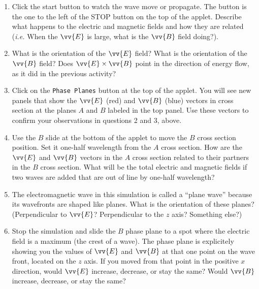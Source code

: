 \begin{enumerate}
\item Click the start button to watch the wave move or propagate. The button is the one to the left of the STOP button on the top of the applet.
Describe what happens to the electric and magnetic fields and how they are related
({\it i.e.} When the $\vv {E}$ is large, what is the $\vv {B}$ field doing?).
\vspace{3.0cm}

\item What is the orientation of the $\vv {E}$ field?
What is the orientation of the $\vv {B}$ field?
Does $\vv {E} \times \vv {B}$ point in the direction of energy flow, as it did in the previous activity?
\vspace{2.0cm}


\item Click on the {\tt Phase Planes} button at the top of the applet.
You will see new panels that show the $\vv {E}$ (red) and $\vv {B}$ (blue) vectors in cross section at the
planes $A$ and $B$ labeled in the top panel.
Use these vectors to confirm your observations in questions 2 and 3, above.
\vspace{3.0cm}

\item Use the $B$ slide at the bottom of the applet to move the $B$ cross 
section position.
Set it one-half wavelength from the $A$ cross section.
How are the $\vv {E}$ and $\vv {B}$ vectors in the $A$ cross section related to their partners 
in the $B$ cross section.
What will be the total electric and magnetic fields if two waves are added that are out of line
by one-half wavelength?
\vspace{1.5cm}

\item The electromagnetic wave in this simulation is called a ``plane wave'' because its wavefronts are shaped like planes.  What is the orientation of these planes?  (Perpendicular to $\vv {E}$?  Perpendicular to the $z$ axis? Something else?) 
\vspace{1.5cm}

\item Stop the simulation and slide the $B$ phase plane to a spot where the electric field is a maximum (the crest of a wave).  The phase plane is explicitely showing you the values of $\vv {E}$ and $\vv {B}$ at that one point on the wave front, located on the $z$ axis.  If you moved from that point in the positive $x$ direction, would $\vv {E}$ increase, decrease, or stay the same?  Would $\vv {B}$ increase, decrease, or stay the same? 
\vspace{2.0cm}

\end{enumerate}

